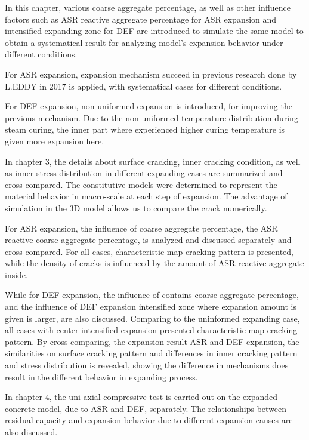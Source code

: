 In this chapter, various coarse aggregate percentage, as well as other influence factors such as ASR reactive aggregate percentage for ASR expansion and intensified expanding zone for DEF are introduced to simulate the same model to obtain a systematical result for analyzing model's expansion behavior under different conditions. 

For ASR expansion, expansion mechanism succeed in previous research done by L.EDDY in 2017 is applied, with systematical cases for different conditions. 

For DEF expansion, non-uniformed expansion is introduced, for improving the previous mechanism. Due to the non-uniformed temperature distribution during steam curing, the inner part where experienced higher curing temperature is given more expansion here.

% 

In chapter 3, the details about surface cracking, inner cracking condition, as well as inner stress distribution in different expanding cases are summarized and cross-compared. The constitutive models were determined to represent the material behavior in macro-scale at each step of expansion. The advantage of simulation in the 3D model allows us to compare the crack numerically.

For ASR expansion, the influence of coarse aggregate percentage, the ASR reactive coarse aggregate percentage, is analyzed and discussed separately and cross-compared. For all cases, characteristic map cracking pattern is presented, while the density of cracks is influenced by the amount of ASR reactive aggregate inside.

While for DEF expansion, the influence of contains coarse aggregate percentage, and the influence of DEF expansion intensified zone where expansion amount is given is larger, are also discussed. Comparing to the uninformed expanding case, all cases with center intensified expansion presented characteristic map cracking pattern. By cross-comparing, the expansion result ASR and DEF expansion, the similarities on surface cracking pattern and differences in inner cracking pattern and stress distribution is revealed, showing the difference in mechanisms does result in the different behavior in expanding process.

%

In chapter 4, the uni-axial compressive test is carried out on the expanded concrete model, due to ASR and DEF, separately. The relationships between residual capacity and expansion behavior due to different expansion causes are also discussed. %

%
